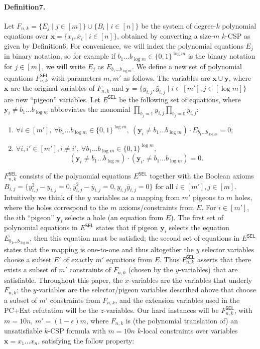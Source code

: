 \documentclass[10pt,a4paper]{article}
\begin{document}
\paragraph{Definition7.}
Let $F_{n,k}=\{E_j\mid j\in[m]\}\cup\{B_i\mid i\in[n]\}$ be the system of degree-$k$ polynomial equations over $\mathbf x=\{x_i,\bar x_i\mid i\in[n]\}$, obtained by converting a size-$m$ $k$-CSP as given by Definition6. For convenience, we will index the polynomial equations $E_j$ in binary notation, so for example if $b_1\ldots b_{\log m}\in\{0,1\}^{\log m}$ is the binary notation for $j\in[m]$, we will write $E_j$ as $E_{b_1\ldots b_{\log m}}$. We define a new set of polynomial equations $F^{\mathsf{SEL}}_{n,k}$ with parameters $m,m'$ as follows. The variables are $\mathbf x\cup\mathbf y$, where $\mathbf x$ are the original variables of $F_{n,k}$ and $\mathbf y=\{y_{i,j},\bar y_{i,j}\mid i\in[m'],j\in[\log m]\}$ are new ``pigeon'' variables. Let $E^{\mathsf{SEL}}$ be the following set of equations, where $\mathbf y_i\neq b_1\ldots b_{\log m}$ abbreviates the monomial $\prod_{b_j=1}y_{i,j}\prod_{b_j=0}\bar y_{i,j}$:
\begin{enumerate}[label=(\roman*)]
\item $\forall i\in[m'],\ \forall b_1\ldots b_{\log m}\in\{0,1\}^{\log m},\ (\mathbf y_i\neq b_1\ldots b_{\log m})\cdot E_{b_1\ldots b_{\log m}}=0$;
\item $\forall i,i'\in[m'],i\neq i',\ \forall b_1\ldots b_{\log m}\in\{0,1\}^{\log m},$
\[(\mathbf y_i\neq b_1\ldots b_{\log m})\cdot(\mathbf y_{i'}\neq b_1\ldots b_{\log m})=0.\]
\end{enumerate}
$F^{\mathsf{SEL}}_{n,k}$ consists of the polynomial equations $E^{\mathsf{SEL}}$ together with the Boolean axioms $B_{i,j}=\{y_{i,j}^2-y_{i,j}=0,\bar y_{i,j}^2-\bar y_{i,j}=0,y_{i,j}\bar y_{i,j}=0\}$ for all $i\in[m'],j\in[m]$.
Intuitively we think of the $y$ variables as a mapping from $m'$ pigeons to $m$ holes, where the holes correspond to the $m$ axioms/constraints from $E$. For $i\in[m']$, the $i$th ``pigeon'' $\mathbf y_i$ selects a hole (an equation from $E$).
The first set of polynomial equations in $E^{\mathsf{SEL}}$ states that if pigeon $\mathbf y_i$ selects the equation $E_{b_1\ldots b_{\log m}}$, then this equation must be satisfied; the second set of equations in $E^{\mathsf{SEL}}$ states that the mapping is one-to-one and thus altogether the $y$ selector variables choose a subset $E'$ of exactly $m'$ equations from $E$. Thus $F^{\mathsf{SEL}}_{n,k}$ asserts that there exists a subset of $m'$ constraints of $F_{n,k}$ (chosen by the $y$-variables) that are satisfiable.
Throughout this paper, the $x$-variables are the variables that underly $F_{n,k}$; the $y$-variables are the selector/pigeon variables described above that choose a subset of $m'$ constraints from $F_{n,k}$, and the extension variables used in the PC+Ext refutation will be the $z$-variables.
Our hard instances will be $F^{\mathsf{SEL}}_{n,k}$, with $m=10n$, $m'=(1-\epsilon)m$, where $F_{n,k}$ is (the polynomial translation of) an unsatisfiable $k$-CSP formula with $m=10n$ $k$-local constraints over variables $\mathbf x=x_1\ldots x_n$, satisfying the follow property:
\end{document}
